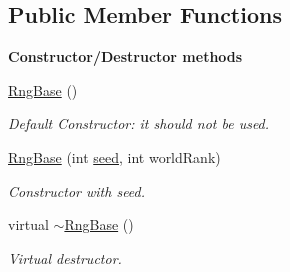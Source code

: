 \subsection*{Public Member Functions}
\begin{Indent}{\bf Constructor/\-Destructor methods}\par
\begin{DoxyCompactItemize}
\item 
\hyperlink{class_q_u_e_s_o_1_1_rng_base_ad8dd3cef9323851cad163c37b815bc88}{Rng\-Base} ()
\begin{DoxyCompactList}\small\item\em Default Constructor\-: it should not be used. \end{DoxyCompactList}\item 
\hyperlink{class_q_u_e_s_o_1_1_rng_base_a5e8dbae3304dfd27211b0d1f6de6eee0}{Rng\-Base} (int \hyperlink{class_q_u_e_s_o_1_1_rng_base_a3094da86084e56faaae9325f1117f9a3}{seed}, int world\-Rank)
\begin{DoxyCompactList}\small\item\em Constructor with seed. \end{DoxyCompactList}\item 
virtual \hyperlink{class_q_u_e_s_o_1_1_rng_base_a64e1281954e342f704d5f3cbcbffa30c}{$\sim$\-Rng\-Base} ()
\begin{DoxyCompactList}\small\item\em Virtual destructor. \end{DoxyCompactList}\end{DoxyCompactItemize}
\end{Indent}
